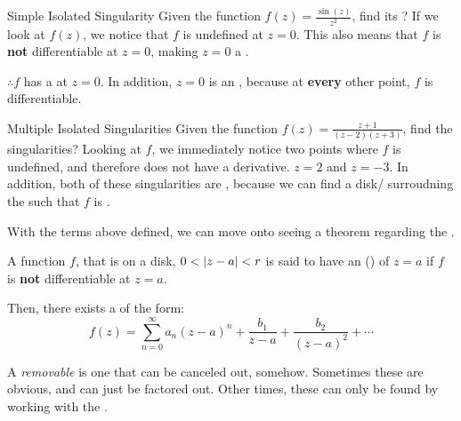 \begin{example}{Simple Isolated Singularity}
  Given the function $f(z) = \frac{\sin(z)}{z^{2}}$, find its ?
  \tcblower{}
  If we look at $f(z)$, we notice that $f$ is undefined at $z=0$.
  This also means that $f$ is \textbf{not} differentiable at $z=0$, making $z=0$ a .

  $\therefore f$ has a  at $z=0$.
  In addition, $z=0$ is an  , because at \textbf{every} other point, $f$ is differentiable.
\end{example}

\begin{example}{Multiple Isolated Singularities}
  Given the function $f(z) = \frac{z+1}{(z-2) (z+3)}$, find the singularities?
  \tcblower{}
  Looking at $f$, we immediately notice two points where $f$ is undefined, and therefore does not have a derivative.
  $z=2$ and $z=-3$.
  In addition, both of these singularities are , because we can find a disk/ surroudning the  such that $f$ is .
\end{example}

With the terms above defined, we can move onto seeing a theorem regarding the .

\begin{theorem}\label{thm:Laurent_Series_Existence}
  A function $f$, that is  on a  disk, $0 < \left\lvert z-a \right\rvert < r$ is said to have an ()  of $z=a$ if $f$ is \textbf{not} differentiable at $z=a$.

  Then, there exists a  of the form:
  \begin{equation}\label{eq:Laurent_Series_Existence}
    f(z) = \sum_{n=0}^{\infty} a_{n} {(z-a)}^{n} + \frac{b_{1}}{z-a} + \frac{b_{2}}{{(z-a)}^{2}} + \cdots
  \end{equation}
\end{theorem}

\begin{definition}[Removable]\label{def:Removable}
  A \emph{removable}  is one that can be canceled out, somehow.
  Sometimes these are obvious, and can just be factored out.
  Other times, these can only be found by working with the .
\end{definition}


